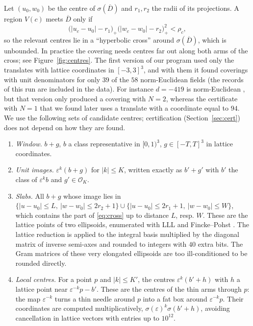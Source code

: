 \documentclass[11pt]{amsart}
\theoremstyle{definition}
\theoremstyle{remark}
\numberwithin{equation}{section}
\newcommand{\cO}{\mathcal{O}}
\begin{document}
Let $(u_0,w_0)$ be the centre of $\sigma(\overline D)$ and $r_1,r_2$ the radii of its
projections. A region $V(c)$ meets $\overline D$ only if
\begin{equation}\label{eq:cross}
  \bigl(|u_c-u_0|-r_1\bigr)_+\bigl(|w_c-w_0|-r_2\bigr)_+^2<\rho_c ,
\end{equation}
so the relevant centres lie in a ``hyperbolic cross'' around $\sigma(\overline D)$, which is
unbounded. In practice the covering needs centres far out along both arms of the cross; see
Figure~\ref{fig:centres}. The first version of our program used only the translates with
lattice coordinates in $[-3,3]^3$, and with them it found coverings with unit denominators for
only $39$ of the $58$ norm-Euclidean fields (the records of this run are included in the
data). For instance $d=-419$ is norm-Euclidean \cite{CL}, but that version only produced a
covering with $N=2$, whereas the certificate with $N=1$ that we found later uses a translate
with a coordinate equal to $94$. We use the following sets of candidate centres; certification
(Section~\ref{sec:cert}) does not depend on how they are found.

\begin{enumerate}
\item[(a)] \emph{Window.} $b+g$, $b$ a class representative in $[0,1)^3$, $g\in[-T,T]^3$ in
lattice coordinates.
\item[(b)] \emph{Unit images.} $\varepsilon^k(b+g)$ for $|k|\le K$, written exactly as
$b'+g'$ with $b'$ the class of $\varepsilon^kb$ and $g'\in\cO_K$.
\item[(c)] \emph{Slabs.} All $b+g$ whose image lies in
$\{|u-u_0|\le L,\ |w-w_0|\le 2r_2+1\}\cup\{|u-u_0|\le 2r_1+1,\ |w-w_0|\le W\}$, which contains
the part of \eqref{eq:cross} up to distance $L$, resp. $W$. These are the lattice points of two
ellipsoids, enumerated with LLL \cite{LLL} and Fincke--Pohst \cite{FP}. The lattice reduction
is applied to the integral basis multiplied by the diagonal matrix of inverse semi-axes and
rounded to integers with $40$ extra bits. The Gram matrices of these very elongated ellipsoids
are too ill-conditioned to be rounded directly.
\item[(d)] \emph{Local centres.} For a point $p$ and $|k|\le K'$, the centres
$\varepsilon^k(b'+h)$ with $h$ a lattice point near $\varepsilon^{-k}p-b'$. These are the
centres of the thin arms through $p$: the map $\varepsilon^{-k}$ turns a thin needle around $p$
into a fat box around $\varepsilon^{-k}p$. Their coordinates are computed multiplicatively,
$\sigma(\varepsilon)^k\sigma(b'+h)$, avoiding cancellation in lattice vectors with entries up
to $10^{12}$.
\end{enumerate}
\end{document}

